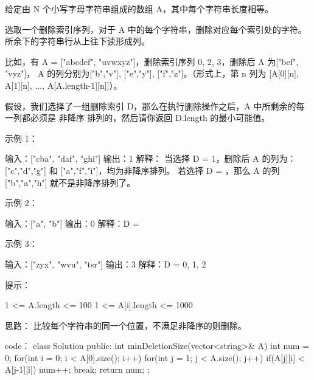 给定由 N 个小写字母字符串组成的数组 A，其中每个字符串长度相等。

选取一个删除索引序列，对于 A 中的每个字符串，删除对应每个索引处的字符。 所余下的字符串行从上往下读形成列。

比如，有 A = ["abcdef", "uvwxyz"]，删除索引序列 {0, 2, 3}，删除后 A 为["bef", "vyz"]， A 的列分别为["b","v"], ["e","y"], ["f","z"]。（形式上，第 n 列为 [A[0][n], A[1][n], ..., A[A.length-1][n]]）。

假设，我们选择了一组删除索引 D，那么在执行删除操作之后，A 中所剩余的每一列都必须是 非降序 排列的，然后请你返回 D.length 的最小可能值。

示例 1：

输入：["cba", "daf", "ghi"]
输出：1
解释：
当选择 D = {1}，删除后 A 的列为：["c","d","g"] 和 ["a","f","i"]，均为非降序排列。
若选择 D = {}，那么 A 的列 ["b","a","h"] 就不是非降序排列了。

示例 2：

输入：["a", "b"]
输出：0
解释：D = {}

示例 3：

输入：["zyx", "wvu", "tsr"]
输出：3
解释：D = {0, 1, 2}

提示：

    1 <= A.length <= 100
    1 <= A[i].length <= 1000





























思路：
比较每个字符串的同一个位置，不满足非降序的则删除。


























code：
class Solution {
public:
    int minDeletionSize(vector<string>& A) {
        int num = 0;
        for(int i = 0; i < A[0].size(); i++)
        {
            for(int j = 1; j < A.size(); j++)
            {
                if(A[j][i] < A[j-1][i])
                {
                    num++;
                    break;
                }
            }
        }
        return num;
    }
};